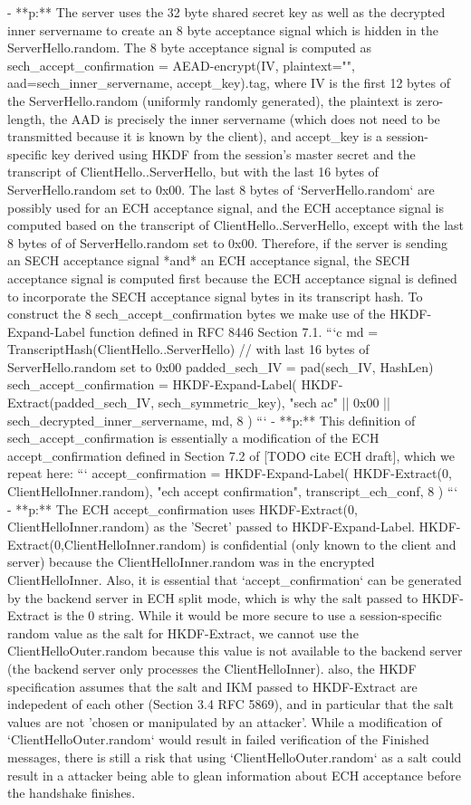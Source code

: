     - **p:** The server uses the 32 byte shared secret key as well as the decrypted inner servername to create an 8 byte acceptance signal which is hidden in the ServerHello.random. The 8 byte acceptance signal is computed as sech_accept_confirmation = AEAD-encrypt(IV, plaintext="", aad=sech_inner_servername, accept_key).tag, where IV is the first 12 bytes of the ServerHello.random (uniformly randomly generated), the plaintext is zero-length, the AAD is precisely the inner servername (which does not need to be transmitted because it is known by the client), and accept_key is a session-specific key derived using HKDF from the session's master secret and the transcript of ClientHello..ServerHello, but with the last 16 bytes of ServerHello.random set to 0x00. The last 8 bytes of `ServerHello.random` are possibly used for an ECH acceptance signal, and the ECH acceptance signal is computed based on the transcript of ClientHello..ServerHello, except with the last 8 bytes of of ServerHello.random set to 0x00. Therefore, if the server is sending an SECH acceptance signal *and* an ECH acceptance signal, the SECH acceptance signal is computed first because the ECH acceptance signal is defined to incorporate the SECH acceptance signal bytes in its transcript hash. To construct the 8 sech_accept_confirmation bytes we make use of the HKDF-Expand-Label function defined in RFC 8446 Section 7.1.
    ```c
    md = TranscriptHash(ClientHello..ServerHello) // with last 16 bytes of ServerHello.random set to 0x00
    padded_sech_IV = pad(sech_IV, HashLen)
    sech_accept_confirmation = HKDF-Expand-Label(
      HKDF-Extract(padded_sech_IV, sech_symmetric_key),
      "sech ac" || 0x00 || sech_decrypted_inner_servername,
      md,
      8
    )
    ```
    - **p:** This definition of sech_accept_confirmation is essentially a modification of the ECH accept_confirmation defined in Section 7.2 of [TODO cite ECH draft], which we repeat here:
```
  accept_confirmation = HKDF-Expand-Label(
    HKDF-Extract(0, ClientHelloInner.random),
    "ech accept confirmation",
    transcript_ech_conf,
    8
  )
```
    - **p:** The ECH accept_confirmation uses HKDF-Extract(0, ClientHelloInner.random) as the 'Secret' passed to HKDF-Expand-Label. HKDF-Extract(0,ClientHelloInner.random) is confidential (only known to the client and server) because the ClientHelloInner.random was in the encrypted ClientHelloInner. Also, it is essential that `accept_confirmation` can be generated by the backend server in ECH split mode, which is why the salt passed to HKDF-Extract is the 0 string. While it would be more secure to use a session-specific random value as the salt for HKDF-Extract, we cannot use the ClientHelloOuter.random because this value is not available to the backend server (the backend server only processes the ClientHelloInner). also, the HKDF specification assumes that the salt and IKM passed to HKDF-Extract are indepedent of each other (Section 3.4 RFC 5869), and in particular that the salt values are not 'chosen or manipulated by an attacker'. While a modification of `ClientHelloOuter.random` would result in failed verification of the Finished messages, there is still a risk that using `ClientHelloOuter.random` as a salt could result in a attacker being able to glean information about ECH acceptance before the handshake finishes.
